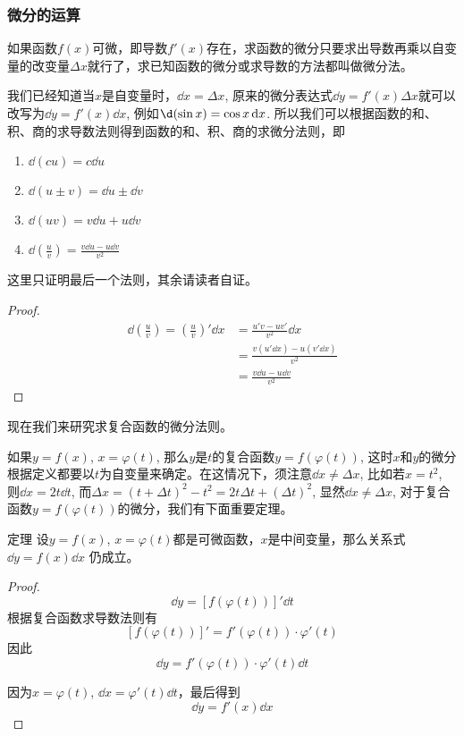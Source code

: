 \subsubsection{微分的运算}

如果函数$f(x)$可微，即导数$f'(x)$存在，求函数的微分只要求出导数再乘以自变量的改变量$\Delta x$就行了，求已知函数的微分或求导数的方法都叫做微分法。

我们已经知道当$x$是自变量时，$\dd x=\Delta x$, 原来的微分表达式$\dd y=f'(x)\Delta x$就可以改写为$\dd y=f'(x)\dd x$, 例如$\d(\sin x)=\cos x \dd x$. 所以我们可以根据函数的和、积、商的求导数法则得到函数的和、积、商的求微分法则，即
\begin{enumerate}
    \item $\dd(cu)=c\dd u$
    \item $\dd(u\pm v)=\dd u\pm \dd v$
    \item $\dd(uv)=v\dd u+u\dd v$
    \item $\dd\left(\frac{u}{v}\right)=\frac{v\dd u-u\dd v}{v^2}$
\end{enumerate}
这里只证明最后一个法则，其余请读者自证。

\begin{proof}
    \[\begin{split}
\dd\left(\frac{u}{v}\right)=\left(\frac{u}{v}\right)'\dd x&=\frac{u'v-uv'}{v^2}\dd x\\
&=\frac{v(u'\dd x)-u(v'\dd x)}{v^2}\\
&=\frac{v\dd u-u\dd v}{v^2}        
    \end{split}\]
\end{proof}

现在我们来研究求复合函数的微分法则。

如果$y=f(x)$, $x=\varphi (t)$, 那么$y$是$t$的复合函数$y=f(\varphi (t))$, 这时$x$和$y$的微分根据定义都要以$t$为自变量来确定。在这情况下，须注意$\dd x\ne \Delta x$, 比如若$x=t^2$, 则$\dd x=2t\dd t$, 而$\Delta x=(t+\Delta t)^2-t^2=2t\Delta t+(\Delta t)^2$, 显然$\dd x\ne \Delta x$, 对于复合函数$y=f(\varphi (t))$的微分，我们有下面重要定理。

\begin{blk}
    {定理} 设$y=f(x)$, $x=\varphi (t)$都是可微函数，$x$是中间变量，那么关系式
$\dd y=f (x) \dd x$
仍成立。
\end{blk}

\begin{proof}
   \[ \dd y=[f(\varphi (t))]'\dd t\]
根据复合函数求导数法则有
\[[f (\varphi  (t) ) ] '=f' (\varphi  (t) ) \cdot \varphi ' (t)\]
因此
\[\dd y=f' (\varphi  (t) ) \cdot \varphi' (t) \dd t\]

因为$x=\varphi  (t)$, $\dd x=\varphi ' (t) \dd t$，最后得到
\[\dd y=f' (x) \dd x\]
\end{proof}

